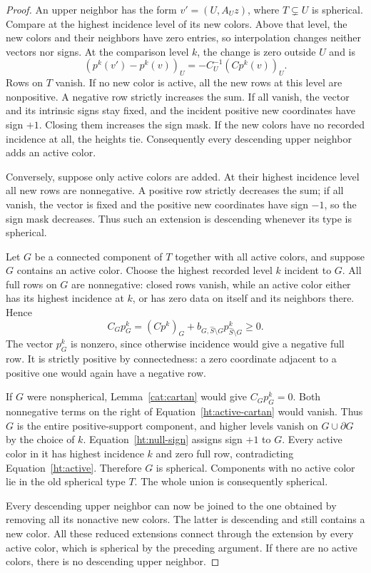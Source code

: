 \begin{proof}
An upper neighbor has the form \(v'=(U,A_Uz)\), where \(T\subsetneq U\)
is spherical.  Compare at the highest incidence level of its new colors.
Above that level, the new colors and their neighbors have zero entries,
so interpolation changes neither vectors nor signs.
At the comparison level \(k\), the change is zero outside \(U\) and is
\begin{equation}
 (p^k(v')-p^k(v))_U=-C_U^{-1}(Cp^k(v))_U.
 \label{ht:global-upper-change}
\end{equation}
Rows on \(T\) vanish.
If no new color is active, all the new rows at this level are
nonpositive.  A negative row strictly increases the sum.  If all
vanish, the vector and its intrinsic signs stay fixed, and the incident
positive new coordinates have sign \(+1\).  Closing them increases
the sign mask.  If the new colors have no recorded incidence at all,
the heights tie.
Consequently every descending upper neighbor adds an active color.

Conversely, suppose only active colors are added.
At their highest incidence level all new rows are nonnegative.
A positive row strictly decreases the sum; if all vanish, the vector
is fixed and the positive new coordinates have sign \(-1\), so the
sign mask decreases.  Thus such an extension is descending whenever
its type is spherical.

Let \(G\) be a connected component of \(T\) together with all active
colors, and suppose \(G\) contains an active color.
Choose the highest recorded level \(k\) incident to \(G\).
All full rows on \(G\) are nonnegative: closed rows vanish, while an
active color either has its highest incidence at \(k\), or has zero
data on itself and its neighbors there.  Hence
\begin{equation}
 C_Gp_G^k=(Cp^k)_G+b_{G,\widehat S\setminus G}p_{\widehat S\setminus G}^k
 \ge0.
 \label{ht:active-cartan}
\end{equation}
The vector \(p_G^k\) is nonzero, since otherwise incidence would give a
negative full row.  It is strictly positive by connectedness: a zero
coordinate adjacent to a positive one would again have a negative row.

If \(G\) were nonspherical, Lemma~\ref{cat:cartan} would give
\(C_Gp_G^k=0\).  Both nonnegative terms on the right of
Equation~\eqref{ht:active-cartan} would vanish.
Thus \(G\) is the entire positive-support component, and higher levels
vanish on \(G\cup\partial G\) by the choice of \(k\).
Equation~\eqref{ht:null-sign} assigns sign \(+1\) to \(G\).
Every active color in it has highest incidence \(k\) and zero full row,
contradicting Equation~\eqref{ht:active}.  Therefore \(G\) is spherical.
Components with no active color lie in the old spherical type \(T\).
The whole union is consequently spherical.

Every descending upper neighbor can now be joined to the one obtained
by removing all its nonactive new colors.  The latter is descending
and still contains a new color.  All these reduced extensions connect
through the extension by every active color, which is spherical by the
preceding argument.  If there are no active colors, there is no
descending upper neighbor.
\end{proof}

